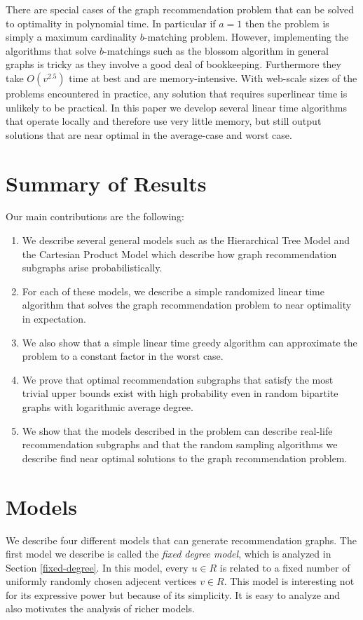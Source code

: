 \documentclass[11pt]{article}
\begin{document}
There are special cases of the graph recommendation problem that can
be solved to optimality in polynomial time. In particular if $a=1$
then the problem is simply a maximum cardinality $b$-matching
problem. However, implementing the algorithms that solve $b$-matchings
such as the blossom algorithm in general graphs is tricky as they
involve a good deal of bookkeeping. Furthermore they take $O(v^{2.5})$
time at best and are memory-intensive. With web-scale sizes of the
problems encountered in practice, any solution that requires
superlinear time is unlikely to be practical. In this paper we
develop several linear time algorithms that operate locally and
therefore use very little memory, but still output solutions
that are near optimal in the average-case and worst case.

\section{Summary of Results}
Our main contributions are the following:
\begin{enumerate}

\item We describe several general models such as the Hierarchical Tree
  Model and the Cartesian Product Model which describe how graph
  recommendation subgraphs arise probabilistically.

\item For each of these models, we describe a simple randomized linear
  time algorithm that solves the graph recommendation problem to near
  optimality in expectation.

\item We also show that a simple linear time greedy algorithm can
  approximate the problem to a constant factor in the worst case.

\item We prove that optimal recommendation subgraphs that satisfy the
  most trivial upper bounds exist with high probability even in random
  bipartite graphs with logarithmic average degree.

\item We show that the models described in the problem can describe
  real-life recommendation subgraphs and that the random sampling
  algorithms we describe find near optimal solutions to the graph
  recommendation problem.

\end{enumerate}

\section{Models}
We describe four different models that can generate recommendation
graphs. The first model we describe is called the {\em fixed degree
model}, which is analyzed in Section \ref{fixed-degree}. In this
model, every $u\in R$ is related to a fixed number of uniformly
randomly chosen adjecent vertices $v\in R$. This model is interesting
not for its expressive power but because of its simplicity.  It is
easy to analyze and also motivates the analysis of richer models.
\end{document}
